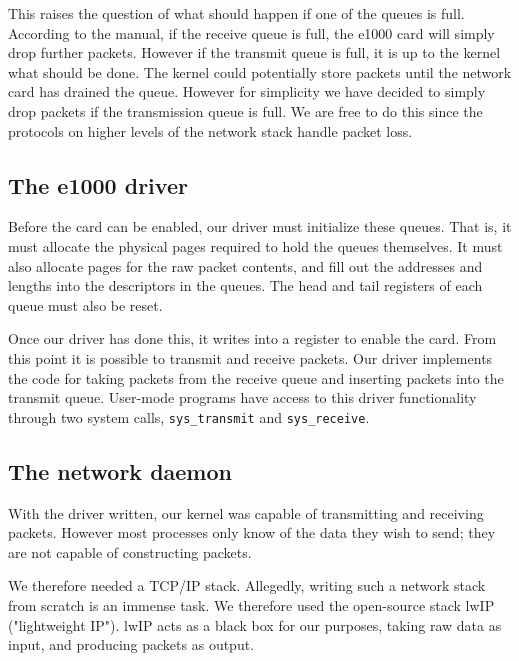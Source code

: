 \documentclass{article}
\begin{document}
This raises the question of what should happen if one of the queues is full.
According to the manual, if the receive queue is full, the e1000 card will
simply drop further packets. However if the transmit queue is full, it is up
to the kernel what should be done. The kernel could potentially store packets
until the network card has drained the queue. However for simplicity we have
decided to simply drop packets if the transmission queue is full. We are free
to do this since the protocols on higher levels of the network stack handle
packet loss.

\subsection{The e1000 driver}
Before the card can be enabled, our driver must initialize these queues. That
is, it must allocate the physical pages required to hold the queues
themselves. It must also allocate pages for the raw packet contents, and fill
out the addresses and lengths into the descriptors in the queues. The head and
tail registers of each queue must also be reset. 

Once our driver has done this, it writes into a register to enable the card.
From this point it is possible to transmit and receive packets. Our driver
implements the code for taking packets from the receive queue and inserting
packets into the transmit queue. User-mode programs have access to this driver
functionality through two system calls, \texttt{sys\_transmit} and
\texttt{sys\_receive}.




\subsection{The network daemon}
With the driver written, our kernel was capable of transmitting and receiving
packets. However most processes only know of the data they wish to send; they
are not capable of constructing packets.

We therefore needed a TCP/IP stack. Allegedly, writing such a network stack
from scratch is an immense task. We therefore used the open-source stack lwIP
("lightweight IP"). lwIP acts as a black box for our purposes, taking raw data
as input, and producing packets as output.
\end{document}
